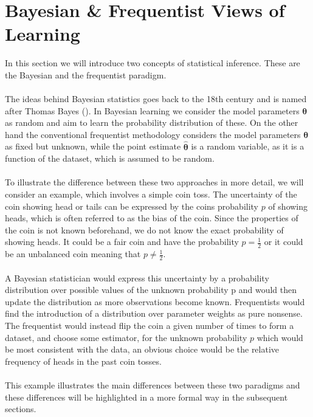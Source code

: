 \section{Bayesian \& Frequentist Views of Learning}\label{sec:bayesian_stat}
In this section we will introduce two concepts of statistical inference. These are the Bayesian and the frequentist paradigm.
\\
\\
The ideas behind Bayesian statistics goes back to the 18th century and is named after Thomas Bayes (\cite{stigler1986history}). In Bayesian learning we consider the model parameters $\boldsymbol{\theta}$ as random and aim to learn the probability distribution of these. On the other hand the conventional frequentist methodology considers the model parameters $\boldsymbol{\theta}$ as fixed but unknown, while the point estimate $\hat{\boldsymbol{\theta}}$ is a random variable, as it is a function of the dataset, which is assumed to be random.
\\
\\
To illustrate the difference between these two approaches in more detail, we will consider an example, which involves a simple coin toss. The uncertainty of the coin showing head or tails can be expressed by the coins probability $p$ of showing heads, which is often referred to as the bias of the coin. Since the properties of the coin is not known beforehand, we do not know the exact probability of showing heads. It could be a fair coin and have the probability $p=\frac{1}{2}$ or it could be an unbalanced coin meaning that $p\neq \frac{1}{2}$.
\\
\\
A Bayesian statistician would express this uncertainty by a probability distribution over possible values of the unknown probability p and would then update the distribution as more observations become known. Frequentists would find the introduction of a distribution over parameter weights as pure nonsense. The frequentist would instead flip the coin a given number of times to form a dataset, and choose some estimator, for the unknown probability $p$ which would be most consistent with the data, an obvious choice would be the relative frequency of heads in the past coin tosses. 
\\
\\
This example illustrates the main differences between these two paradigms and these differences will be highlighted in a more formal way in the subsequent sections.



